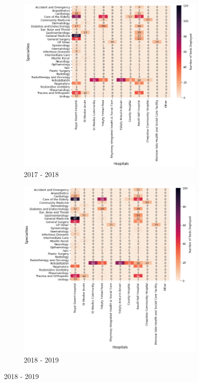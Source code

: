 \documentclass[../thesis.tex]{subfiles}
\begin{document}
\begin{figure}
     \centering
     \begin{subfigure}[h!]{0.8\textwidth}
         \centering
         \includegraphics[width=\textwidth]{Chapters/Chapter5/Figures/2017DET.png}
         \caption{2017 - 2018}
         \label{fig:detexp2a}
     \end{subfigure}
\hfill
     \begin{subfigure}{0.8\textwidth}
         \centering
         \includegraphics[width=\textwidth]{Chapters/Chapter5/Figures/2018DET.png}
         \caption{2018 - 2019}
         \label{fig:detexp2b}
     \end{subfigure}
     \end{figure}
\end{document}

